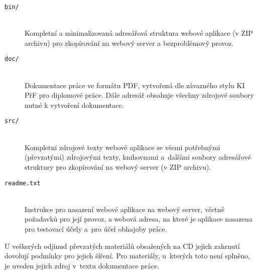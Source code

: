 \documentclass[11pt,oneside]{fithesis}
\begin{document}
\begin{description}

\item[\texttt{bin/}] \hfill \\
Kompletní a minimalizovaná adresářová struktura webové aplikace (v ZIP archivu) pro zkopírování na webový server a bezproblémový provoz.

\item[\texttt{doc/}] \hfill \\
Dokumentace práce ve formátu PDF, vytvořená dle závazného stylu KI PřF pro diplomové práce. Dále adresář obsahuje všechny zdrojové soubory nutné k vytvoření dokumentace.

\item[\texttt{src/}] \hfill \\
Kompletní zdrojové texty webové aplikace se všemi potřebnými (převzatými) zdrojovými texty,
knihovnami a~dalšími soubory adresářové struktury pro zkopírování na webový server (v ZIP archivu).

\item[\texttt{readme.txt}] \hfill \\
Instrukce pro nasazení webové aplikace na webový server, včetně požadavků pro její provoz, a
webová adresa, na které je aplikace nasazena pro testovací účely a~pro účel obhajoby práce.

\end{description}
U veškerých odjinud převzatých materiálů obsažených na CD jejich zahrnutí dovolují podmínky pro jejich šíření. Pro materiály, u~kterých toto není splněno, je uveden jejich zdroj v~textu dokumentace práce.
\end{document}
